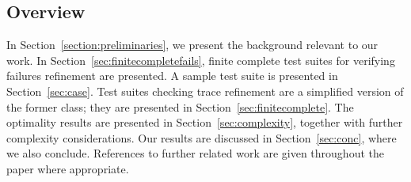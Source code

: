 %
%
%


\subsection{Overview}
In Section~\ref{section:preliminaries}, we present the background
relevant to our work. In Section~\ref{sec:finitecompletefails}, finite
complete test suites for verifying failures refinement are presented. 
A sample test
suite is presented in Section~\ref{sec:case}.
Test
suites checking trace refinement are a simplified version of the former
class; they are presented in Section~\ref{sec:finitecomplete}.
The optimality results are presented in Section~\ref{sec:complexity}, together with further
complexity considerations.
 Our results are discussed in
Section~\ref{sec:conc}, where we also conclude. References to further related work
are given throughout the paper where appropriate.

